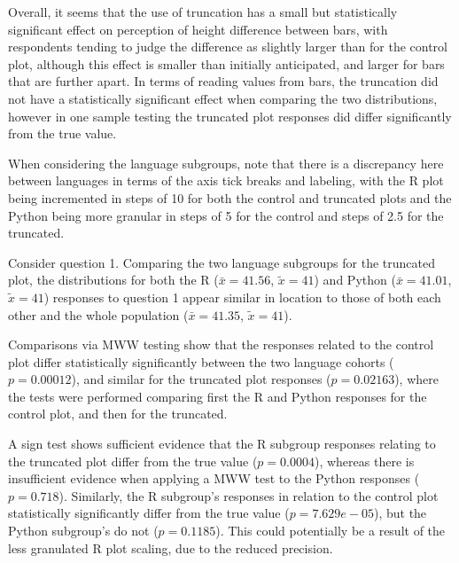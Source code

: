 \documentclass[
]{article}
\begin{document}
Overall, it seems that the use of truncation has a small but
statistically significant effect on perception of height difference
between bars, with respondents tending to judge the difference as
slightly larger than for the control plot, although this effect is
smaller than initially anticipated, and larger for bars that are further
apart. In terms of reading values from bars, the truncation did not have
a statistically significant effect when comparing the two distributions,
however in one sample testing the truncated plot responses did differ
significantly from the true value.

When considering the language subgroups, note that there is a
discrepancy here between languages in terms of the axis tick breaks and
labeling, with the R plot being incremented in steps of 10 for both the
control and truncated plots and the Python being more granular in steps
of 5 for the control and steps of 2.5 for the truncated.

Consider question 1. Comparing the two language subgroups for the
truncated plot, the distributions for both the R (\(\bar{x} = 41.56\),
\(\tilde{x} = 41\)) and Python (\(\bar{x} = 41.01\), \(\tilde{x} = 41\))
responses to question 1 appear similar in location to those of both each
other and the whole population (\(\bar{x} = 41.35\),
\(\tilde{x} = 41\)).

Comparisons via MWW testing show that the responses related to the
control plot differ statistically significantly between the two language
cohorts (\(p=0.00012\)), and similar for the truncated plot responses
(\(p=0.02163\)), where the tests were performed comparing first the R
and Python responses for the control plot, and then for the truncated.

A sign test shows sufficient evidence that the R subgroup responses
relating to the truncated plot differ from the true value
(\(p = 0.0004\)), whereas there is insufficient evidence when applying a
MWW test to the Python responses (\(p = 0.718\)). Similarly, the R
subgroup's responses in relation to the control plot statistically
significantly differ from the true value (\(p=7.629e-05\)), but the
Python subgroup's do not (\(p=0.1185\)). This could potentially be a
result of the less granulated R plot scaling, due to the reduced
precision.
\end{document}
